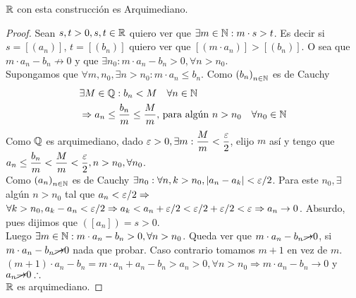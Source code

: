 \begin{theorem}
	\(\mathbb{R} \) con esta construcción es Arquimediano.
	\begin{proof}
		Sean \(s, t > 0, s, t \in \mathbb{R} \) quiero ver que \(\exists m \in \mathbb{N} : m \cdot s > t \).
		Es decir si \(s = [(a_n)]\), \(t = [(b_n)]\) quiero ver que \([(m \cdot a_n)] > [(b_n)]\). O sea que \(m \cdot a_n - b_n \not \to 0\) y que \(\exists n_0 : m \cdot a_n - b_n > 0, \forall n> n_0\). \\
		Supongamos que \(\forall m, n_0, \exists n>n_0 : m \cdot a_n \leq b_n\).
		Como \({(b_n)}_{n \in \mathbb{N}} \) es de Cauchy\begin{align*}
			 & \exists M \in \mathbb{Q} : b_n < M \quad \forall n \in \mathbb{N}                                                           \\
			 & \Rightarrow a_n \leq \dfrac{b_n}{m} \leq \dfrac{M}{m}\text{, para algún } n > n_0 \quad \forall n_0 \in \mathbb{N}
		\end{align*}
		Como \(\mathbb{Q} \) es arquimediano, dado \(\varepsilon > 0, \exists m : \dfrac{M}{m} < \dfrac{\varepsilon}{2} \), elijo \(m\) así y tengo que \(a_n \leq \dfrac{b_n}{m} < \dfrac{M}{m} < \dfrac{\varepsilon}{2}, n > n_0, \forall n_0\). \\
		Como \({(a_n)}_{n \in \mathbb{N}} \) es de Cauchy \(\exists n_0 : \forall n,k > n_0, |a_n - a_k| < \varepsilon/2\). Para este \(n_0, \exists \) algún \(n > n_0\) tal que \(a_n < \varepsilon / 2 \Rightarrow \) \\
		\(\forall k > n_0, a_k - a_n < \varepsilon / 2 \Rightarrow a_k < a_n + \varepsilon / 2 < \varepsilon / 2 + \varepsilon / 2 < \varepsilon \Rightarrow a_n \to 0\). Absurdo, pues dijimos que \(([a_n]) = s > 0\). \\
		Luego \(\exists m \in \mathbb{N} : m \cdot a_n - b_n > 0, \forall n > n_0\). Queda ver que \(m \cdot a_n - b_n \cancel{\to} 0\), si \(m \cdot a_n - b_n \cancel{\to} 0\) nada que probar. Caso contrario tomamos \(m+1\) en vez de \(m\). \\
		\((m+1) \cdot a_n - b_n = m \cdot a_n + a_n - b_n > a_n > 0, \forall n > n_0 \Rightarrow m \cdot a_n - b_n \to 0\) y \(a_n \cancel{\to} 0 \therefore \) \\
		\(\mathbb{R} \) es arquimediano.
	\end{proof}
\end{theorem}

